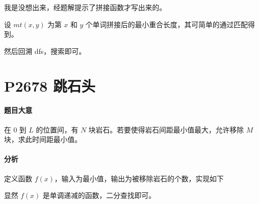 我是没想出来，经题解提示了拼接函数才写出来的。

设 $mt(x,y)$ 为第 $x$ 和 $y$ 个单词拼接后的最小重合长度，其可简单的通过匹配得到。

然后回溯 dfs，搜索即可。

\section{P2678 跳石头}

\paragraph{题目大意}

在 $0$ 到 $L$ 的位置间，有 $N$ 块岩石。若要使得岩石间距最小值最大，允许移除 $M$ 块，求此时间距最小值。

\paragraph{分析}

定义函数 $f(x)$，输入为最小值，输出为被移除岩石的个数，实现如下

显然 $f(x)$ 是单调递减的函数，二分查找即可。
